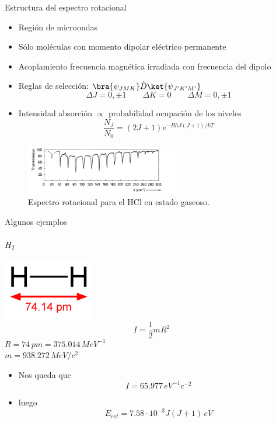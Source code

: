 \documentclass[a4paper]{beamer}
\begin{document}
\begin{frame}{Estructura del espectro rotacional}
\begin{itemize}
\item Región de microondas
\item Sólo moléculas con momento dipolar eléctrico permanente
\item Acoplamiento frecuencia magnética irradiada con frecuencia del dipolo
\item Reglas de selección: $\bra{\psi_{JMK}}\hat D \ket{\psi_{J'K'M'}}$
\begin{equation*}
\Delta J = 0,\pm 1 \qquad\Delta K =0 \qquad \Delta M = 0, \pm 1
\end{equation*}
\item Intensidad absorción $\propto$ probabilidad ocupación de los niveles
\begin{equation*}
\frac{N_J}{N_0}=(2J+1)e^{-BhJ(J+1)/kT}
\end{equation*}
\end{itemize}
\begin{figure}
\includegraphics[width=0.6\textwidth]{intensidad.png}
\caption{Espectro rotacional para el HCl en estado gaseoso.}
\label{intensidad}
\end{figure}
\end{frame}

\begin{frame}{Algunos ejemplos}
\framesubtitle{$H_2$}
\includegraphics[width=0.3\textwidth]{hidrogeno.png}\\
$$I=\frac{1}{2}mR^2$$
 $R=74 \, pm=375.014 \, MeV^{-1}$\\
 $m=938.272 \, MeV/c^2$\\
 \begin{itemize}
  \item Nos queda que 
 $$I=65.977 \, eV^{-1}c^{-2}$$
\item luego 
 $$E_{rot} = 7.58\cdot 10^{-3}J(J+1)\, eV$$
 \end{itemize}
\end{frame}
\end{document}
